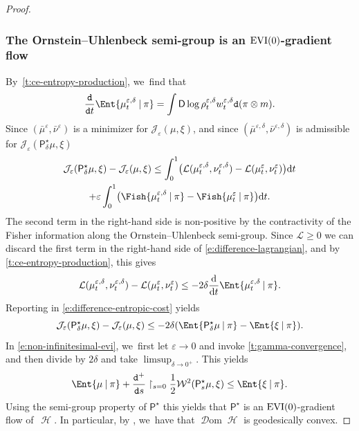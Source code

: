 \documentclass[10pt]{amsart}
\newcommand{\EVI}{\textup{EVI}}
\theoremstyle{definition}
\theoremstyle{remark}
\DeclarePairedDelimiter{\paren}{\lparen}{\rparen}
\newcommand{\given}[1][]{%
\nonscript\:#1\vert
\allowbreak
\nonscript\:
\mathopen{}}
\DeclareMathOperator{\ent}{\mathcal{H}}
\DeclareMathOperator{\dom}{\mathscr{D}om}
\begin{document}
\begin{proof}
\subsubsection*{The Ornstein--Uhlenbeck semi-group is an $\EVI(0)$-gradient flow}
By~\cref{t:ce-entropy-production}, we~find that
\begin{equation}\label{e:entropy-production-epsilon}
\frac{\mathtt{d}}{\mathtt{d} t} \Ent{ \mu_{t}^{\varepsilon,\delta} \given \pi } = \int \mathsf{D} \log \rho^{\varepsilon,\delta}_{t} w^{\varepsilon,\delta}_{t} \mathtt{d} (\pi \otimes m).
\end{equation}
Since $(\bar{\mu}^{\varepsilon}, \bar{\nu}^{\varepsilon})$ is a minimizer for $\mathcal{J}_{\varepsilon}(\mu, \xi)$, and since $(\bar{\mu}^{\varepsilon,\delta}, \bar{\nu}^{\varepsilon,\delta})$ is admissible for $\mathcal{J}_{\varepsilon}(\mathsf{P}^{\star}_{\delta}\mu, \xi)$
\begin{multline}\label{e:difference-entropic-cost}
\mathcal{J}_{\varepsilon}(\mathsf{P}^{\star}_{\delta}\mu, \xi) - \mathcal{J}_{\varepsilon}(\mu, \xi) \leq \int_{0}^{1} \paren[\big]{\mathcal{L}(\mu^{\varepsilon,\delta}_{t}, \nu^{\varepsilon,\delta}_{t}) - \mathcal{L}(\mu^{\varepsilon}_{t}, \nu^{\varepsilon}_{t})} \mathrm{d} t\\
+ \varepsilon \int_{0}^{1} \paren[\big]{ \Fish{ \mu^{\varepsilon,\delta}_{t} \given \pi } - \Fish{ \mu^{\varepsilon}_{t} \given \pi } } \mathrm{d} t.
\end{multline}
The second term in the right-hand side is non-positive by the contractivity of the Fisher information along the Ornstein--Uhlenbeck semi-group.
Since $\mathcal{L} \geq 0$ we can discard the first term in the right-hand side of \cref{e:difference-lagrangian}, and by \cref{t:ce-entropy-production}, this gives
\begin{equation*}
\mathcal{L}(\mu^{\varepsilon,\delta}_{t}, \nu^{\varepsilon,\delta}_{t}) - \mathcal{L}(\mu^{\varepsilon}_{t}, \nu^{\varepsilon}_{t}) \leq -2 \delta \frac{\mathrm{d}}{\mathrm{d} t} \Ent{ \mu^{\varepsilon,\delta}_{t} \given \pi }.
\end{equation*}
Reporting in \cref{e:difference-entropic-cost} yields
\begin{equation}\label{e:non-infinitesimal-evi}
\mathcal{J}_{\varepsilon}(\mathsf{P}^{\star}_{\delta}\mu, \xi) - \mathcal{J}_{\varepsilon}(\mu, \xi) \leq - 2 \delta \paren*{ \Ent{ \mathsf{P}^{\star}_{\delta} \mu \given \pi } - \Ent{ \xi \given \pi } }.
\end{equation}
In \cref{e:non-infinitesimal-evi}, we~first let $\varepsilon \to 0$ and invoke \cref{t:gamma-convergence}, and then divide by $2 \delta$ and take $\limsup_{\delta \to 0^{+}}$.
This yields
\begin{equation*}
\Ent{ \mu \given \pi } + \frac{\mathtt{d}^{+}}{\mathtt{d} s} \restriction_{s=0} \frac{1}{2} \mathcal{W}^{2}(\mathsf{P}^{\star}_{s}\mu, \xi) \leq \Ent{ \xi \given \pi }.
\end{equation*}
Using the semi-group property of $\mathsf{P}^{\star}$ this yields that $\mathsf{P}^{\star}$ is an $\EVI(0)$-gradient flow of~$\ent$.
In particular, by \cite[Th.\,2.1]{DaneriSavare}, we~have that $\dom \ent$ is geodesically convex.


\end{proof}
\end{document}
